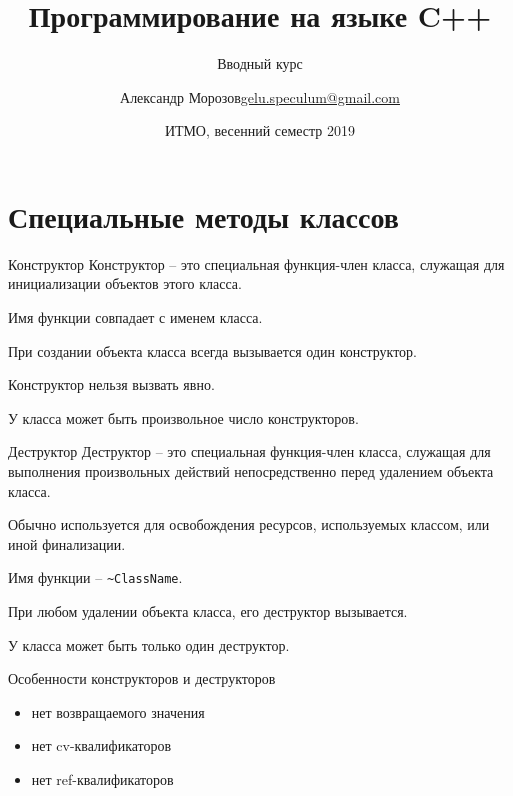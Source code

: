 \documentclass[unknownkeysallowed,xcolor=table]{beamer}
\title[C++]
{Программирование на языке C++}
\subtitle{Вводный курс}
\author[А.~Б.~Морозов]
{
  \texorpdfstring{Александр Морозов\newline\href{mailto:gelu.speculum@gmail.com}{gelu.speculum@gmail.com}}
  {Александр Морозов}
}
\date[ITMO 2019]
{ИТМО, весенний семестр 2019}
\begin{document}
\frame{\titlepage}



\section{Специальные методы классов}

\begin{frame}{Конструктор}
Конструктор -- это специальная функция-член класса, служащая для инициализации объектов этого класса.

\vspace{1em}

Имя функции совпадает с именем класса.

\vspace{1em}

При создании объекта класса всегда вызывается один конструктор.

\vspace{1em}

Конструктор нельзя вызвать явно.

\vspace{1em}

У класса может быть произвольное число конструкторов.
\end{frame}

\begin{frame}[fragile]{Деструктор}
Деструктор -- это специальная функция-член класса, служащая для выполнения произвольных действий непосредственно перед удалением объекта класса.

\vspace{1em}

Обычно используется для освобождения ресурсов, используемых классом, или иной финализации.

\vspace{1em}

Имя функции -- \lstinline{~ClassName}.

\vspace{1em}

При любом удалении объекта класса, его деструктор вызывается.

\vspace{1em}

У класса может быть только один деструктор.
\end{frame}

\begin{frame}{Особенности конструкторов и деструкторов}
\begin{itemize}
  \item нет возвращаемого значения \vspace{1em}
  \item нет cv-квалификаторов \vspace{1em}
  \item нет ref-квалификаторов
\end{itemize}
\end{frame}
\end{document}
